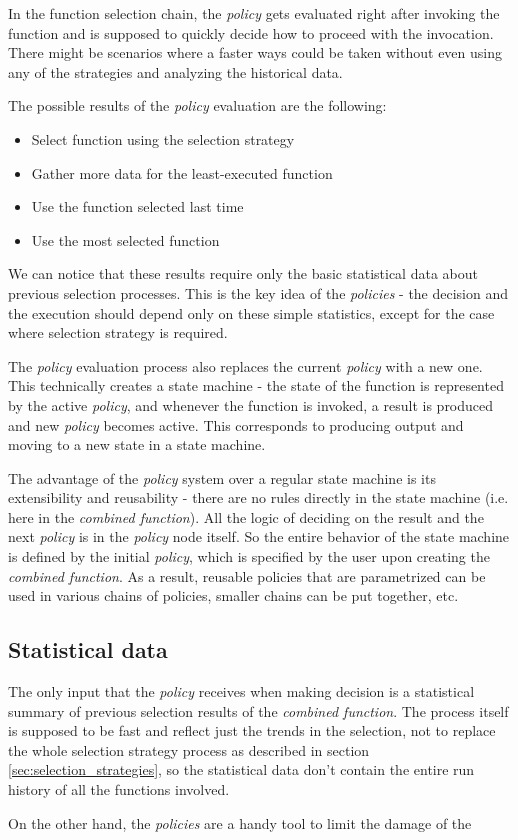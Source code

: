 In the function selection chain, the \textit{policy} gets evaluated right after invoking the function and is supposed to quickly decide how to proceed with the invocation. There might be scenarios where a faster ways could be taken without even using any of the strategies and analyzing the historical data.

The possible results of the \textit{policy} evaluation are the following:

\begin{itemize}
	\item Select function using the selection strategy
	\item Gather more data for the least-executed function
	\item Use the function selected last time
	\item Use the most selected function
\end{itemize}

We can notice that these results require only the basic statistical data about previous selection processes. This is the key idea of the \textit{policies} - the decision and the execution should depend only on these simple statistics, except for the case where selection strategy is required.

The \textit{policy} evaluation process also replaces the current \textit{policy} with a new one. This technically creates a state machine - the state of the function is represented by the active \textit{policy}, and whenever the function is invoked, a result is produced and new \textit{policy} becomes active. This corresponds to producing output and moving to a new state in a state machine.

The advantage of the \textit{policy} system over a regular state machine is its extensibility and reusability - there are no rules directly in the state machine (i.e. here in the \textit{combined function}). All the logic of deciding on the result and the next \textit{policy} is in the \textit{policy} node itself. So the entire behavior of the state machine is defined by the initial \textit{policy}, which is specified by the user upon creating the \textit{combined function}. As a result, reusable policies that are parametrized can be used in various chains of policies, smaller chains can be put together, etc.

\subsection{Statistical data}

The only input that the \textit{policy} receives when making decision is a statistical summary of previous selection results of the \textit{combined function}. The process itself is supposed to be fast and reflect just the trends in the selection, not to replace the whole selection strategy process as described in section \ref{sec:selection_strategies}, so the statistical data don't contain the entire run history of all the functions involved.

On the other hand, the \textit{policies} are a handy tool to limit the damage of the 

